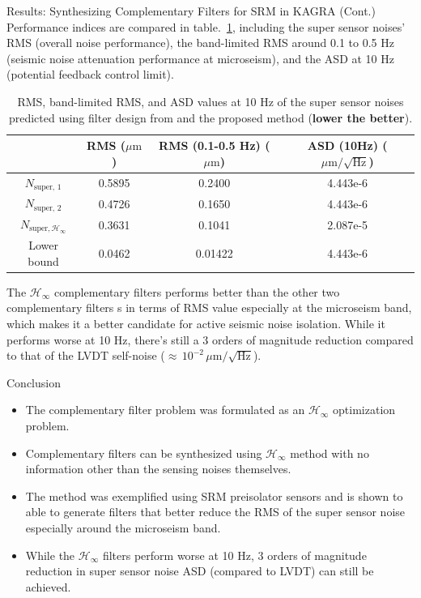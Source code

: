 \documentclass{beamer}
\begin{document}
\begin{frame}[t]
\begin{columns}[t]
\begin{column}{0.32\linewidth}
\begin{block}{Results: Synthesizing Complementary Filters for SRM in KAGRA (Cont.)}
			Performance indices are compared in table.~\ref{table:metrics}, including the super sensor noises' RMS (overall noise performance), the band-limited RMS around 0.1 to 0.5 Hz (seismic noise attenuation performance at microseism), and the ASD at 10 Hz (potential feedback control limit).
			\begin{table}
				\begin{tabular}{|c|c|c|c|}
					\hline
					& RMS ($\mu\text{m}$) & RMS (0.1-0.5 Hz) ($\mu\text{m}$)& ASD (10Hz) ($\mu\text{m}/\sqrt{\text{Hz}}$)\\
					\hline
					$N_\text{super, 1}$ & 0.5895 & 0.2400 & 4.443e-6\\
					\hline
					$N_\text{super, 2}$ & 0.4726 & 0.1650 & 4.443e-6\\
					\hline
					$N_{\text{super}, \mathcal{H}_\infty}$ & 0.3631 & 0.1041 & 2.087e-5\\
					\hline
					Lower bound & 0.0462 & 0.01422 & 4.443e-6\\
					\hline
				\end{tabular}
				\caption{RMS, band-limited RMS, and ASD values at 10 Hz of the super sensor noises predicted using filter design from \cite{Sekiguchi:2016bmv,vanHeijningen:2018cpc} and the proposed method (\textbf{lower the better}).}
				\label{table:metrics}
			\end{table}
			The $\mathcal{H}_\infty$ complementary filters performs better than the other two complementary filters s in terms of RMS value especially at the microseism band, which makes it a better candidate for active seismic noise isolation.
			While it performs worse at 10 Hz, there's still a 3 orders of magnitude reduction compared to that of the LVDT self-noise ($\approx\, 10^{-2}\,\mu\text{m}/\sqrt{\text{Hz}}$).
			\end{block}
			\begin{block}{Conclusion}
				\begin{itemize}
					\item The complementary filter problem was formulated as an $\mathcal{H}_\infty$ optimization problem.
					\item Complementary filters can be synthesized using $\mathcal{H}_\infty$ method with no information other than the sensing noises themselves.
					\item The method was exemplified using SRM preisolator sensors and is shown to able to generate filters that better reduce the RMS of the super sensor noise especially around the microseism band.
					\item While the $\mathcal{H}_\infty$ filters perform worse at 10 Hz, 3 orders of magnitude reduction in super sensor noise ASD (compared to LVDT) can still be achieved.

\end{itemize}
\end{block}
\end{column}
\end{columns}
\end{frame}
\end{document}
